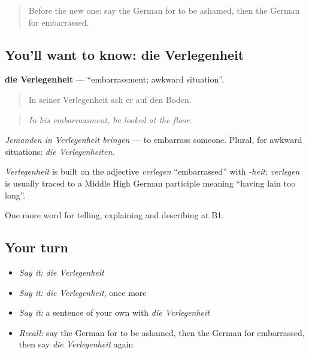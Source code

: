 \label{lesson:GE-C467-verlegenheit}



\begin{quote}
Before the new one: say the German for to be ashamed, then the German for embarrassed.
\end{quote}

\subsection*{You'll want to know: die Verlegenheit}
\textbf{die Verlegenheit} — \textquotedblleft{}embarrassment; awkward situation\textquotedblright{}.

\begin{quote}
In seiner Verlegenheit sah er auf den Boden.
\end{quote}

\begin{quote}
\emph{In his embarrassment, he looked at the floor.}
\end{quote}

\emph{Jemanden in Verlegenheit bringen} — to embarrass someone. Plural, for awkward situations: \emph{die Verlegenheiten}.

\begin{cousinweb}
\emph{Verlegenheit} is built on the adjective \emph{verlegen} \textquotedblleft{}embarrassed\textquotedblright{} with \emph{-heit}; \emph{verlegen} is usually traced to a Middle High German participle meaning \textquotedblleft{}having lain too long\textquotedblright{}.
\end{cousinweb}

\begin{grammarlens}[title={What you've built}]
One more word for telling, explaining and describing at B1.
\end{grammarlens}

\subsection*{Your turn}
\begin{itemize}
\raggedright
  \item \emph{Say it:} \emph{die Verlegenheit}
  \item \emph{Say it:} \emph{die Verlegenheit}, once more
  \item \emph{Say it:} a sentence of your own with \emph{die Verlegenheit}
  \item \emph{Recall:} say the German for to be ashamed, then the German for embarrassed, then say \emph{die Verlegenheit} again
\end{itemize}

